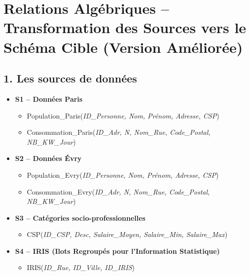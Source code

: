 \begin{abstract}
Ce document décrit le module de qualité de données mis en place autour du job Talend \enquote{Split_address_population_paris} (simplement le nom du job) pour l'evaluation et amélioration
de la qualité de donnée
de consommation énergétique.
Il détaille l'architecture, les mappings, le plan de tests (syntaxiques et sémantiques), ainsi que l'analyse des résultats observés sur les jeux d'essais (Paris, Évry, CSP).
La qualité est évaluée selon les dimensions: complétude, fraîcheur, exactitude, cohérence, adéquation, interprétabilité, portabilité, flexibilité, accessibilité, disponibilité et réputation.
Des recommandations d'industrialisation et des artefacts (regex, expressions Talend, KPI) sont fournis en annexe.
\end{abstract}

\section*{Relations Algébriques -- Transformation des Sources vers le Schéma Cible (Version Améliorée)}

\subsection*{1. Les sources de données}
\begin{itemize}
\item \textbf{S1 -- Données Paris}
\begin{itemize}
\item Population_Paris(\textit{ID_Personne, Nom, Prénom, Adresse, CSP})
\item Consommation_Paris(\textit{ID_Adr, N, Nom_Rue, Code_Postal, NB_KW_Jour})
\end{itemize}
\item \textbf{S2 -- Données Évry}
\begin{itemize}
\item Population_Evry(\textit{ID_Personne, Nom, Prénom, Adresse, CSP})
\item Consommation_Evry(\textit{ID_Adr, N, Nom_Rue, Code_Postal, NB_KW_Jour})
\end{itemize}
\item \textbf{S3 -- Catégories socio-professionnelles}
\begin{itemize}
\item CSP(\textit{ID_CSP, Desc, Salaire_Moyen, Salaire_Min, Salaire_Max})
\end{itemize}
\item \textbf{S4 -- IRIS (Ilots Regroupés pour l'Information Statistique)}
\begin{itemize}
\item IRIS(\textit{ID_Rue, ID_Ville, ID_IRIS})
\end{itemize}
\end{itemize}

